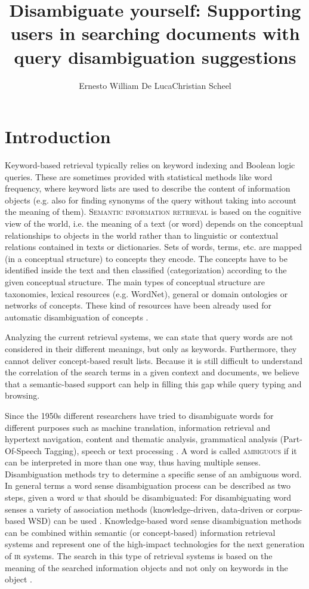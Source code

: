 \documentclass[output=paper]{LSP/langsci}
\title{Disambiguate yourself: {S}upporting users in searching documents with query disambiguation suggestions}
\author{Ernesto William De Luca\affiliation{University of Applied Sciences Potsdam, Germany}\lastand Christian Scheel\affiliation{Technische Universität Berlin, DAI-Labor, Berlin, Germany }}
\begin{document}
 


\section{Introduction} 
Keyword-based retrieval typically relies on keyword indexing and Boolean logic queries. These are sometimes provided with statistical methods like word frequency, where keyword lists are used to describe the content of information objects (e.g. also for finding synonyms of the query without taking into account the meaning of them). \textsc{Semantic information retrieval} is based on the cognitive view of the world, i.e. the meaning of a text (or word) depends on the conceptual relationships to objects in the world rather than to linguistic or contextual relations contained in texts or dictionaries. Sets of words, terms, etc. are mapped (in a conceptual structure) to concepts they encode. The concepts have to be identified inside the text and then classified (categorization) according to the given conceptual structure. The main types of conceptual structure are taxonomies, lexical resources (e.g. WordNet), general or domain ontologies or networks of concepts. These kind of resources have been already used for automatic disambiguation of concepts \citet{HaaLub01}. \par
Analyzing the current retrieval systems, we can state that query words are not considered in their different meanings, but only as keywords. Furthermore, they cannot deliver concept-based result lists. Because it is still difficult to understand the correlation of the search terms in a given context and documents, we believe that a semantic-based support can help in filling this gap while query typing and browsing. \par

Since the 1950s different researchers have tried to disambiguate words for different purposes such as machine translation, information retrieval and hypertext navigation, content and thematic analysis, grammatical analysis (Part-Of-Speech Tagging), speech or text processing \citet{IdeVer98}. A word is called \textsc{ambiguous} if it can be interpreted in more than one way, thus having multiple senses.  Disambiguation methods try to determine a specific sense of an ambiguous word. In general terms a word sense disambiguation process can be described as two steps, given a word $w$ that should be disambiguated:
For disambiguating word senses a variety of association methods (knowledge-driven, data-driven or corpus-based WSD) can be used \citet{IdeVer98}. 
Knowledge-based word sense disambiguation methods can be combined within semantic (or concept-based) information retrieval systems and represent one of the high-impact technologies for the next generation of \textsc{ir} systems. The search in this type of retrieval systems is based on the meaning of the searched information objects and not only on keywords in the object \citet{HaaLub01}. \par 
\end{document}
